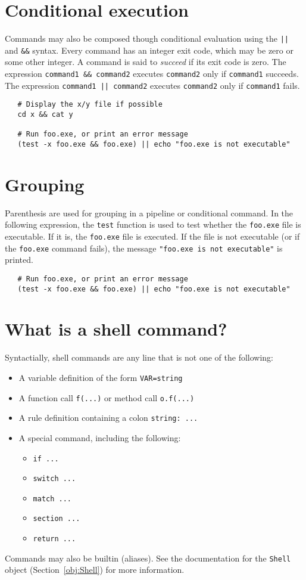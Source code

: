 \section{Conditional execution}

Commands may also be composed though conditional evaluation using the \verb+||+ and \verb+&&+
syntax.  Every command has an integer exit code, which may be zero or some other integer.  A command
is said to \emph{succeed} if its exit code is zero.  The expression \verb+command1 && command2+
executes \verb+command2+ only if \verb+command1+ succeeds.  The expression
\verb+command1 || command2+ executes \verb+command2+ only if \verb+command1+ fails.

\begin{verbatim}
   # Display the x/y file if possible
   cd x && cat y

   # Run foo.exe, or print an error message
   (test -x foo.exe && foo.exe) || echo "foo.exe is not executable"
\end{verbatim}

\section{Grouping}

Parenthesis are used for grouping in a pipeline or conditional command.  In the following
expression, the \verb+test+ function is used to test whether the \verb+foo.exe+ file is executable.
If it is, the \verb+foo.exe+ file is executed.  If the file is not executable (or if the
\verb+foo.exe+ command fails), the message \verb+"foo.exe is not executable"+ is printed.

\begin{verbatim}
   # Run foo.exe, or print an error message
   (test -x foo.exe && foo.exe) || echo "foo.exe is not executable"
\end{verbatim}

\section{What is a shell command?}

Syntactially, shell commands are any line that is not one of the following:

\begin{itemize}
\item A variable definition of the form \verb+VAR=string+
\item A function call \verb+f(...)+ or method call \verb+o.f(...)+
\item A rule definition containing a colon \verb+string: ...+
\item A special command, including the following:
\begin{itemize}
\item \verb+if ...+
\item \verb+switch ...+
\item \verb+match ...+
\item \verb+section ...+
\item \verb+return ...+
\end{itemize}
\end{itemize}

Commands may also be builtin (aliases).  See the documentation for the
\verb+Shell+ object (Section~\ref{obj:Shell}) for more information.

